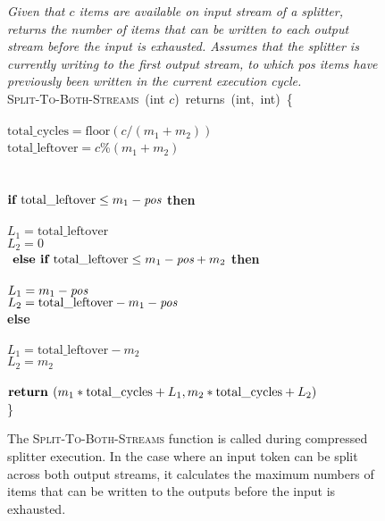\begin{figure}[t!]
\centering
\begin{minipage}{0.75\textwidth}
{\it Given that $c$ items are available on input stream of a splitter,
  returns the number of items that can be written to each output
  stream before the input is exhausted.  Assumes that the splitter is
  currently writing to the first output stream, to which pos items
  have previously been written in the current execution cycle.}\\
\textsc{Split-To-Both-Streams}~(int $c$)~returns~(int,~int)~\{\\
\\
 $\mbox{total\_cycles} = \mbox{floor}(c/(m_1 + m_2))$\\
 $\mbox{total\_leftover} = c$\%$(m_1 + m_2)$\\
~\\
\\
\tab$\mbox{\bf if~} \mbox{total\_leftover} \leq m_1 - \mbox{\it pos}$ {\bf then}\\
\tab{}\\
\tab\tab$L_1 = \mbox{total\_leftover}$\\
\tab\tab$L_2 = 0$\\
\tab$\mbox{\bf~else if~} \mbox{total\_leftover} \leq m_1-\mbox{\it pos} + m_2$ {\bf then}\\
\tab{}\\
\tab\tab$L_1 = m_1-\mbox{\it pos}$\\
\tab\tab$L_2 = \mbox{total\_leftover} - m_1-\mbox{\it pos}$\\
\tab\mbox{\bf else}\\
\tab{}\\
\tab\tab$L_1 = \mbox{total\_leftover} - m_2$\\
\tab\tab$L_2 = m_2$\\
~ \\
\tab$\mbox{\bf return~}(m_1*\mbox{total\_cycles} + L_1, m_2*\mbox{total\_cycles} + L_2)$\\
\}
\end{minipage}
\caption[\textsc{Split-To-Both-Streams} function for compressed splitter
  execution.]{The \textsc{Split-To-Both-Streams} function is called during
  compressed splitter execution.  In the case where an input token can
  be split across both output streams, it calculates the maximum
  numbers of items that can be written to the outputs before the input
  is exhausted.\protect\label{fig:split-to-both-streams}}
\end{figure}


